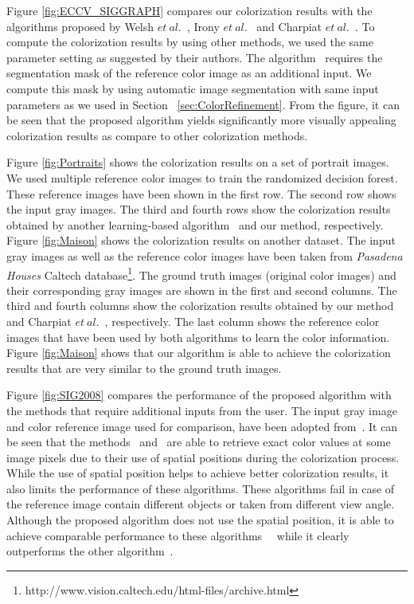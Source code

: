 \documentclass[twocolumn]{svjour3}          %
\begin{document}
Figure \ref{fig:ECCV_SIGGRAPH} compares our colorization results with the algorithms proposed by Welsh $et\ al.$~\cite{Welsh02}, Irony $et\ al.$~\cite{Irony05} and Charpiat $et\ al.$~\cite{Charpiat08}. To compute the colorization results by using other methods, we used the same parameter setting as suggested by their authors. The algorithm~\cite{Irony05} requires the segmentation mask of the reference color image as an additional input. We compute this mask by using automatic image segmentation with same input parameters as we used in Section ~\ref{sec:ColorRefinement}. From the figure, it can be seen that the proposed algorithm yields significantly more visually appealing colorization results as compare to other colorization methods.

Figure \ref{fig:Portraits} shows the colorization results on a set of portrait images. We used multiple reference color images to train the randomized decision forest. These reference images have been shown in the first row. The second row shows the input gray images. The third and fourth rows show the colorization results obtained by another learning-based algorithm~\cite{Charpiat08} and our method, respectively. Figure \ref{fig:Maison} shows the colorization results on another dataset. The input gray images as well as the reference color images have been taken from \emph{Pasadena Houses} Caltech database\footnote{http://www.vision.caltech.edu/html-files/archive.html}. The ground truth images (original color images) and their corresponding gray images are shown in the first and second columns. The third and fourth columns show the colorization results obtained by our method and Charpiat $et\ al.$~\cite{Charpiat08}, respectively. The last column shows the reference color images that have been used by both algorithms to learn the color information. Figure \ref{fig:Maison} shows that our algorithm is able to achieve the colorization results that are very similar to the ground truth images.

Figure \ref{fig:SIG2008} compares the performance of the proposed algorithm with the methods that require additional inputs from the user. The input gray image and color reference image used for comparison, have been adopted from~\cite{Liu08}. It can be seen that the methods~\cite{Liu08} and~\cite{Alex11} are able to retrieve exact color values at some image pixels due to their use of spatial positions during the colorization process. While the use of spatial position helps to achieve better colorization results, it also limits the performance of these algorithms. These algorithms fail in case of the reference image contain different objects or taken from different view angle. Although the proposed algorithm does not use the spatial position, it is able to achieve comparable performance to these algorithms~\cite{Liu08}~\cite{Alex11} while it clearly outperforms the other algorithm~\cite{Irony05}.
\end{document}
